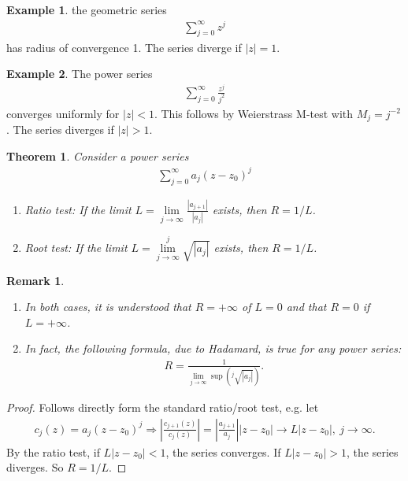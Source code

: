 \documentclass[12pt, a4paper]{article}
\theoremstyle{plain}
\newtheorem{thm}{Theorem} %
\newtheorem{rem}{Remark}
\theoremstyle{definition}
\newtheorem{example}{Example} %
\begin{document}
		\begin{example}
			the geometric series 
			\begin{align*}
				\sum\limits_{j=0}^{\infty}z^j
			\end{align*}
			has radius of convergence 1. The series diverge if $|z|=1$.\\
		\end{example}

		\begin{example}
			The power series 
			\begin{align*}
				\sum\limits_{j=0}^{\infty}\frac{z^j}{j^2}
			\end{align*}
			converges uniformly for $|z|<1$. This follows by Weierstrass M-test with $M_j=j^{-2}$. The series diverges if $|z|>1$.\\
		\end{example}

		\begin{thm}
			Consider a power series
			\begin{align*}
				\sum\limits_{j=0}^{\infty}a_j(z-z_0)^j
			\end{align*}
			\begin{enumerate}[label=(\roman*)]
				\item Ratio test: If the limit $\displaystyle L = \lim\limits_{j\to\infty} \frac{|a_{j+1}|}{|a_j|}$ exists, then $R=1/L$.
				\item Root test: If the limit $\displaystyle L = \lim\limits_{j\to\infty} ^j\sqrt{|a_j|}$ exists, then $R=1/L$.\\
			\end{enumerate}
		\end{thm}

		\begin{rem}~\\
			\begin{enumerate}[label=(\roman*)]
				\item In both cases, it is understood that $R=+\infty$ of $L=0$ and that $R=0$ if $L=+\infty$.
				\item In fact, the following formula, due to Hadamard, is true for any power series:
				\begin{align*}
					R = \frac{1}{\lim\limits_{j\to\infty}\sup(^j\sqrt{|a_j|})}.
				\end{align*}
			\end{enumerate}
		\end{rem}

		\begin{proof}
			Follows directly form the standard ratio/root test, e.g. let 
			\begin{align*}
				c_j(z) =
				a_j(z-z_0)^j\Rightarrow \left|\frac{c_{j+1}(z)}{c_j(z)}\right| =
				\left|\frac{a_{j+1}}{a_j}\right||z-z_0| \to L|z-z_0|,\:j\to\infty.
			\end{align*}
			By the ratio test, if $L|z-z_0|<1$, the series converges. If $L|z-z_0|>1$, the series diverges. So $R=1/L$. 
		\end{proof}
\end{document}
